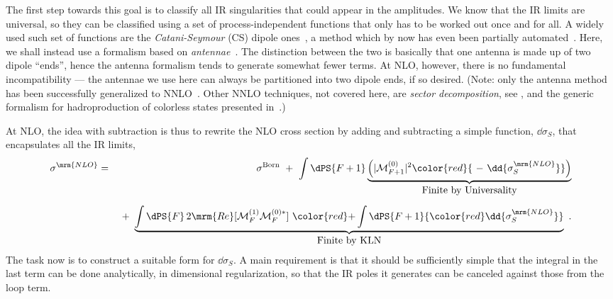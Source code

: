 The first step towards this goal is to classify all IR singularities
that could appear in the amplitudes. We know that the IR limits are
universal, so they can be classified using a set of
process-independent functions that only has to be worked out once and
for all. A widely used such set of functions are the 
\emph{Catani-Seymour} (CS) dipole ones~\cite{Catani:1996vz,Catani:1996jh},
a method which by now has even been partially automated~\cite{Nagy:2003tz,Frederix:2008hu}. 
Here,  
we shall instead use a formalism based
on \emph{antennae}~\cite{Kosower:1997zr,Kosower:2003bh,GehrmannDeRidder:2005cm}.    
The distinction between the two is basically that one antenna is made
up of two dipole ``ends'', hence the antenna formalism tends to
generate somewhat fewer terms. At NLO, however, there is no fundamental
incompatibility --- the antennae we use here can always be
partitioned into two dipole ends, if so desired. (Note: 
%
%
only the antenna method has been 
successfully generalized to 
NNLO~\cite{GehrmannDeRidder:2007hr,Weinzierl:2008iv}. Other NNLO 
techniques, not covered here, are \emph{sector decomposition}, 
see \cite{Heinrich:2008si,Boughezal:2011jf}, and the generic formalism 
for hadroproduction of colorless states presented in~\cite{Catani:2007vq}.)

At NLO, the idea with subtraction is thus to rewrite the NLO cross section
by adding and subtracting a simple function, $\dd{\sigma_S}$, 
that encapsulates all the
IR limits, 
\begin{eqnarray}
\sigma^\mrm{NLO} & = & 
 \sigma^\mathrm{Born} 
 \ + \ \int \dPS{F+1} \underbrace{\left(|{\cal M}^{(0)}_{F+1}|^2
{\color{red}{ \ - \ \dd{\sigma_S^\mrm{NLO}}}}\right)}_{\mbox{Finite by
Universality}} \nonumber \\[2mm]
&& \ + \ \underbrace{\int \dPS{F} \, 2\mrm{Re}[{\cal M}_{F}^{(1)} {\cal
M}_F^{(0)*}] \ {\color{red}+} \int \dPS{F+1} {\color{red}\dd{\sigma_S^\mrm{NLO}}}
}_{\mbox{Finite by KLN}}~.\label{eq:subtraction}
\end{eqnarray}
The task now is to construct a suitable form for $\dd{\sigma_S}$. A
main requirement is that it 
should be sufficiently simple that the integral in the last term can
be done analytically, in dimensional regularization, 
so that the IR poles it generates can be canceled against those
from the loop term.

